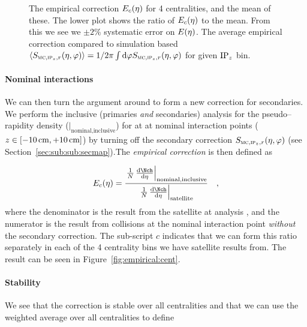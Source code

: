 \documentclass[compat,11pt]{alicenote}
\newcommand*{\etaphi}{\ensuremath(\eta,\varphi)}
\newcommand*\SecMap{\ensuremath S_{\subMC,\subIPz,r}\etaphi}
\newcommand*\EmpCor[1][]{\ensuremath E\ifx|#1|\relax\else_{#1}\fi(\eta)}
\newcommand{\secref}[1]{Section~\ref{#1}}
\newcommand{\figref}[1]{Figure~\ref{#1}}
\newcommand\figinput[2][\textwidth]{%
  \texttt{[image: \\jobname-\#2]}}
\begin{document}
\begin{figure}[h!tbp]
  \centering
  \subfigure[]{
    \label{fig:empirical:cent}\figinput[.45\linewidth]{empirical_cent}}
  \subfigure[]{
    \label{fig:empirical:secmap}\figinput[.45\linewidth]{secmap_empcor}}
  \caption{ The empirical correction
    $\EmpCor[c]{}$ for 4 centralities, and the mean of these.  The
    lower plot shows the ratio of $\EmpCor[c]{}$ to the mean.  From
    this we see we $\pm2\%$ systematic error on
    $\EmpCor{}$.  The average empirical
    correction compared to simulation based
    $\langle\SecMap\rangle=1/2\pi\int\text{d}\varphi\SecMap{}$ for
    given $\IPz{}$ bin. } 
\end{figure}


\paragraph{Nominal interactions} 
We can then turn the argument around to form a new correction for
secondaries.  We perform the inclusive (primaries \emph{and}
secondaries) analysis for the pseudo--rapidity density
(\ndndeta{}$|_{\text{nominal,inclusive}}$) for \PbPbCol{} at
 at nominal interaction points
($z\in[\unit[-10]{\text{cm}},\unit[+10]{\text{cm}}]$) by turning off
the secondary correction $\SecMap$ (see
\secref{sec:sub:sub:secmap}).The \emph{empirical correction} is then
defined as

\begin{equation}
  \label{eq:empirical:cent}
  \EmpCor[c]{} = \frac{%
    \left.\ndndeta\right|_{\text{nominal,inclusive}}}{%
    \left.\ndndeta\right|_{\text{satellite}}}\quad,
\end{equation}
where the denominator is the result from the satellite \PbPbCol{} at
 analysis \cite{Abbas:2013bpa}, and the numerator is
the result from collisions at the nominal interaction point
\emph{without} the secondary correction.   The sub-script $c$
indicates that we can form this ratio separately in each of the 4
centrality bins we have satellite results from.  The result can be
seen in \figref{fig:empirical:cent}. 

\paragraph{Stability}
We see that the correction is stable over all centralities and that we
can use the weighted average over all centralities to define 
\end{document}

